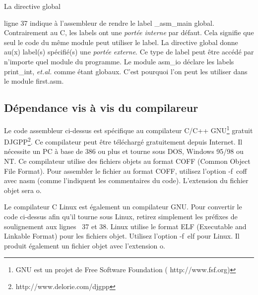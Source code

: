 La directive {\code global} { ligne 37
indique à l'assembleur de rendre le label {\code \_asm\_main} global.
Contrairement au C, les labels ont une \emph{portée interne} par
défaut. Cela signifie que seul le code du même module peut utiliser
le label. La directive {\code global} donne au(x) label(s) spécifié(s)
une \emph{portée externe}. Ce type de label peut être accédé par
n'importe quel module du programme. Le module {\code asm\_io}
déclare les labels {\code print\_int}, {\em et.al.\/} comme étant globaux.
C'est pourquoi l'on peut les utiliser dans le module {\code first.asm}.

\subsection{Dépendance vis à vis du compilareur}

Le code assembleur ci-dessus est spécifique au compilateur C/C++
GNU\footnote{GNU est un projet de Free Software Foundation  ({\code
http://www.fsf.org})} gratuit
DJGPP\footnote{\code http://www.delorie.com/djgpp}. Ce compilateur peut
être téléchargé gratuitement depuis Internet. Il nécessite un PC
à base de 386 ou plus et tourne sous DOS, Windows 95/98 ou NT. Ce compilateur
utilise des fichiers objets au format COFF (Common Object File Format).
Pour assembler le fichier au format COFF, utilisez l'option  {\code -f~coff}
avec {\code nasm} (comme l'indiquent les commentaires du code).
L'extension du fichier objet sera {\code o}.

Le compilateur C Linux est également un compilateur GNU.  
Pour convertir le code ci-dessus afin qu'il tourne sous Linux, retirez simplement
les préfixes de soulignement aux lignes ~37 et 38. Linux utilise le format
ELF (Executable and Linkable Format) pour les fichiers objet. Utilisez
l'option {\code -f~elf} pour Linux. Il produit également un fichier objet
avec l'extension {\code o}.

}

